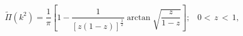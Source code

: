 \begin{equation}
{\tilde{\Pi}}(k^{2})={\frac{1}{\pi }}\left[ 1-\frac{1}{\left[ z\left(
1-z\right) \right] ^{\frac{1}{2}}}\arctan \sqrt{\frac{z}{1-z}}\right]
;\,\,\,\,\,0<\,z\,<\,1,
\end{equation}

